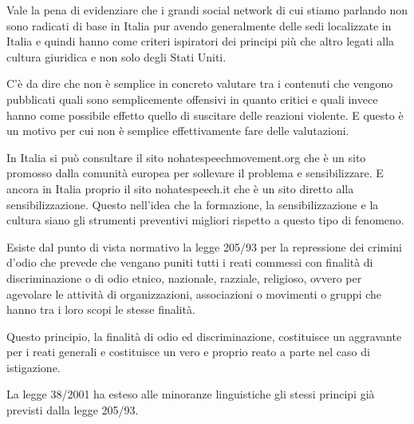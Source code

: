 Vale la pena di evidenziare che i grandi social network di cui stiamo parlando non sono radicati di base in Italia pur avendo generalmente delle sedi localizzate in Italia e quindi hanno come criteri ispiratori dei principi più che altro legati alla cultura giuridica e non solo degli Stati Uniti.\par
C'è da dire che non è semplice in concreto valutare tra i contenuti che vengono pubblicati quali sono semplicemente offensivi in quanto critici e quali invece hanno come possibile effetto quello di suscitare delle reazioni violente. E questo è un motivo per cui non è semplice effettivamente fare delle valutazioni. \par
In Italia si può consultare il sito nohatespeechmovement.org che è un sito promosso dalla comunità europea per sollevare il problema e sensibilizzare. E ancora in Italia proprio il sito nohatespeech.it che è un sito diretto alla sensibilizzazione. Questo nell'idea che la formazione, la sensibilizzazione e la cultura siano gli strumenti preventivi migliori rispetto a questo tipo di fenomeno.\par
Esiste dal punto di vista normativo la legge 205/93 per la repressione dei crimini d'odio che prevede che vengano puniti tutti i reati commessi con finalità di discriminazione o di odio etnico, nazionale, razziale, religioso, ovvero per agevolare le attività di organizzazioni, associazioni o movimenti o gruppi che hanno tra i loro scopi le stesse finalità.\par
Questo principio, la finalità di odio ed discriminazione, costituisce un aggravante per i reati generali e costituisce un vero e proprio reato a parte nel caso di istigazione.\par
La legge 38/2001 ha esteso alle minoranze linguistiche gli stessi principi già previsti dalla legge 205/93.\par

